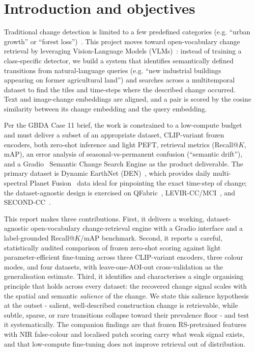 \documentclass{article}
\begin{document}
\section{Introduction and objectives}
\label{sec:intro}

Traditional change detection is limited to a few predefined categories
(e.g. ``urban growth'' or ``forest loss'')~\cite{changedetection}. This project
moves toward open-vocabulary change retrieval by leveraging Vision-Language
Models (VLMs)~\cite{clip}: instead of training a class-specific detector, we
build a system that identifies semantically defined transitions from
natural-language queries (e.g. ``new industrial buildings appearing on former
agricultural land'') and searches across a multitemporal dataset to find the
tiles and time-steps where the described change occurred. Text and image-change
embeddings are aligned, and a pair is scored by the cosine similarity between
its change embedding and the query embedding.

Per the GBDA Case 11 brief, the work is constrained to a low-compute budget and
must deliver a subset of an appropriate dataset, CLIP-variant frozen encoders,
both zero-shot inference and light PEFT, retrieval metrics (Recall@$K$, mAP), an
error analysis of seasonal-vs-permanent confusion (``semantic drift''), and a
Gradio~\cite{gradio} Semantic Change Search Engine as the product deliverable.
The primary dataset is Dynamic EarthNet (DEN)~\cite{dynamicearthnet}, which
provides daily multi-spectral Planet Fusion~\cite{planetfusion} data ideal for
pinpointing the exact time-step of change; the dataset-agnostic design is
exercised on QFabric~\cite{qfabric}, LEVIR-CC/MCI~\cite{levircc,levirmci}, and
SECOND-CC~\cite{secondcc}.

This report makes three contributions. First, it delivers a working,
dataset-agnostic open-vocabulary change-retrieval engine with a Gradio interface
and a label-grounded Recall@$K$/mAP benchmark. Second, it reports a careful,
statistically audited comparison of frozen zero-shot scoring against light
parameter-efficient fine-tuning across three CLIP-variant encoders, three colour
modes, and four datasets, with leave-one-AOI-out cross-validation as the
generalisation estimate. Third, it identifies and characterises a single
organising principle that holds across every dataset: the recovered change
signal scales with the spatial and semantic \emph{salience} of the change. We
state this salience hypothesis at the outset - salient, well-described
construction change is retrievable, while subtle, sparse, or rare transitions
collapse toward their prevalence floor - and test it systematically. The
companion findings are that frozen RS-pretrained features with NIR false-colour
and localised patch scoring carry what weak signal exists, and that low-compute
fine-tuning does not improve retrieval out of distribution.
\end{document}
